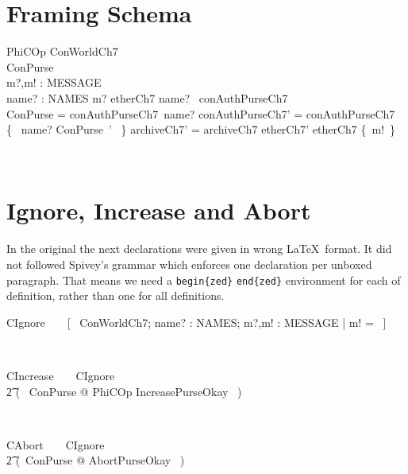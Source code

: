 \section{Framing Schema}\label{ch7.PhiCOp}

\begin{LSDef}
\begin{schema}{PhiCOp}
  \Delta ConWorldCh7
  \\      \Delta ConPurse
  \\      m?,m! : MESSAGE
  \\      name? : NAMES
  \where
  m? \in etherCh7
  \also
  name? \in \dom~conAuthPurseCh7
  \\      \theta ConPurse = conAuthPurseCh7~name?
  \also
  conAuthPurseCh7' = conAuthPurseCh7 \oplus \{~ name? \mapsto \theta ConPurse~' ~\}
  \also
  archiveCh7' = archiveCh7
  \also
  etherCh7' \subseteq etherCh7 \cup \{~m!~\}
\end{schema}~\end{LSDef}

\section{Ignore, Increase and Abort}

In the original the next declarations were given in wrong \LaTeX\ format. It
did not followed Spivey's grammar which enforces one declaration per unboxed
paragraph. That means we need a \verb|begin{zed}| \verb|end{zed}| environment
for each of definition, rather than one for all definitions.
%
\begin{LSDef}
\begin{zed}
  CIgnore~~~~[~ \Xi ConWorldCh7; name? : NAMES; m?,m! : MESSAGE | m! = \bot ~]
\end{zed}~\end{LSDef}

\begin{LSDef}
\begin{zed}
  CIncrease~~~~CIgnore
  \\ \t2  \lor (~ \exists \Delta ConPurse @ PhiCOp \land IncreasePurseOkay ~)
\end{zed}~\end{LSDef}
%
\begin{LSDef}
\begin{zed}
  CAbort~~~~CIgnore
  \\ \t2          \lor (~\exists \Delta ConPurse @
  AbortPurseOkay \land [~ PhiCOp | m! = \bot ~]~)
\end{zed}~\end{LSDef}


